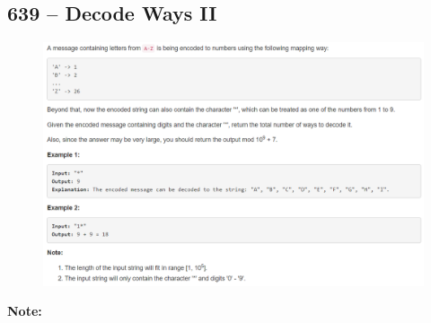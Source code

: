\documentclass[a4paper,12pt]{article}
\begin{document}
\subsection{639 -- Decode Ways II}
\begin{figure}[H]
	\begin{center}
		\includegraphics[width=18cm]{639.png}
	\end{center}
\end{figure}
\textbf{\large{Note:}}
\par
\vspace{0.5em}
\end{document}
